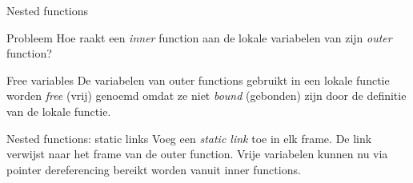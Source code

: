 \documentclass{beamer}
\begin{document}
\begin{frame}{Nested functions}
	\begin{alertblock}{Probleem}
		Hoe raakt een \emph{inner} function aan de lokale variabelen van zijn \emph{outer} function?
	\end{alertblock}
	\begin{block}{Free variables}
		De variabelen van outer functions gebruikt in een lokale functie worden \emph{free} (vrij) genoemd omdat ze niet \emph{bound} (gebonden) zijn door de definitie van de lokale functie.
	\end{block}
\end{frame}

\begin{frame}{Nested functions: static links}
	Voeg een \emph{static link} toe in elk frame. De link verwijst naar het frame van de outer function. Vrije variabelen kunnen nu via pointer dereferencing bereikt worden vanuit inner functions.
\end{frame}
\end{document}
